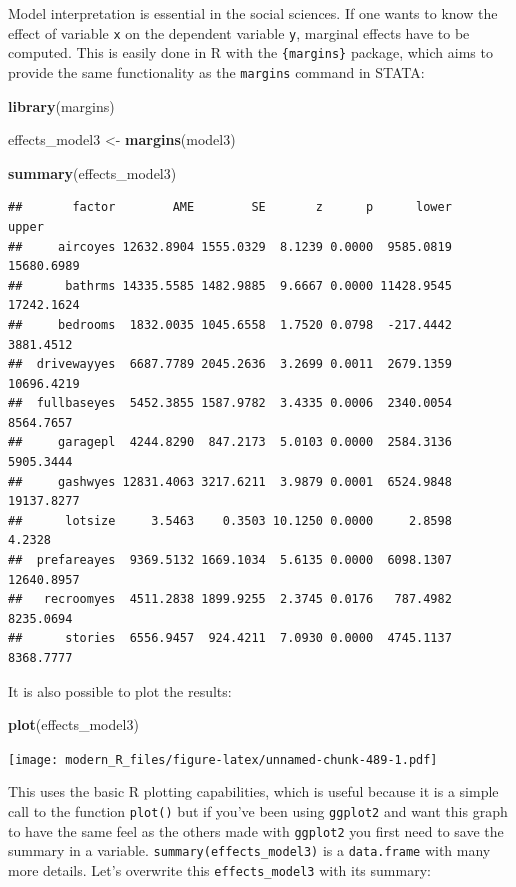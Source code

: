\documentclass[]{gitbook}
\newenvironment{Shaded}{\begin{snugshade}}{\end{snugshade}}
\newcommand{\KeywordTok}[1]{\textcolor[rgb]{0.13,0.29,0.53}{\textbf{#1}}}
\newcommand{\NormalTok}[1]{#1}
\newcommand{\StringTok}[1]{\textcolor[rgb]{0.31,0.60,0.02}{#1}}
\begin{document}
Model interpretation is essential in the social sciences. If one wants to know the effect of
variable \texttt{x} on the dependent variable \texttt{y}, marginal effects have to be computed. This is easily
done in R with the \texttt{\{margins\}} package, which aims to provide the same functionality as the
\texttt{margins} command in STATA:

\begin{Shaded}
\begin{Highlighting}[]
\KeywordTok{library}\NormalTok{(margins)}

\NormalTok{effects_model3 <-}\StringTok{ }\KeywordTok{margins}\NormalTok{(model3)}

\KeywordTok{summary}\NormalTok{(effects_model3)}
\end{Highlighting}
\end{Shaded}

\begin{verbatim}
##       factor        AME        SE       z      p      lower      upper
##     aircoyes 12632.8904 1555.0329  8.1239 0.0000  9585.0819 15680.6989
##      bathrms 14335.5585 1482.9885  9.6667 0.0000 11428.9545 17242.1624
##     bedrooms  1832.0035 1045.6558  1.7520 0.0798  -217.4442  3881.4512
##  drivewayyes  6687.7789 2045.2636  3.2699 0.0011  2679.1359 10696.4219
##  fullbaseyes  5452.3855 1587.9782  3.4335 0.0006  2340.0054  8564.7657
##     garagepl  4244.8290  847.2173  5.0103 0.0000  2584.3136  5905.3444
##     gashwyes 12831.4063 3217.6211  3.9879 0.0001  6524.9848 19137.8277
##      lotsize     3.5463    0.3503 10.1250 0.0000     2.8598     4.2328
##  prefareayes  9369.5132 1669.1034  5.6135 0.0000  6098.1307 12640.8957
##   recroomyes  4511.2838 1899.9255  2.3745 0.0176   787.4982  8235.0694
##      stories  6556.9457  924.4211  7.0930 0.0000  4745.1137  8368.7777
\end{verbatim}

It is also possible to plot the results:

\begin{Shaded}
\begin{Highlighting}[]
\KeywordTok{plot}\NormalTok{(effects_model3)}
\end{Highlighting}
\end{Shaded}

\texttt{[image: modern\_R\_files/figure-latex/unnamed-chunk-489-1.pdf]}

This uses the basic R plotting capabilities, which is useful because it is a simple call to the
function \texttt{plot()} but if you've been using \texttt{ggplot2} and want this graph to have the same feel as
the others made with \texttt{ggplot2} you first need to save the summary in a variable.
\texttt{summary(effects\_model3)} is a \texttt{data.frame} with many more details. Let's overwrite this
\texttt{effects\_model3} with its summary:
\end{document}
